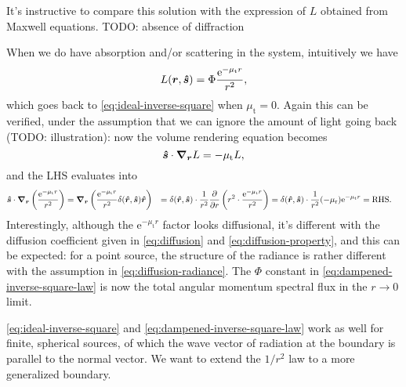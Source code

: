 \documentclass[hyperref, a4paper]{article}
\newcommand*{\ee}{\mathrm{e}}
\def\\{}%
\begin{document}
It's instructive to compare this solution with 
the expression of $L$ obtained from Maxwell equations.
TODO: absence of diffraction

When we do have absorption and/or scattering in the system, 
intuitively we have 
\begin{equation}
    L(\vb*{r}, \vu*{s}) = \Phi \frac{\ee^{- \mu_{\text{t}} r}}{r^2},
    \label{eq:dampened-inverse-square-law}
\end{equation}
which goes back to \eqref{eq:ideal-inverse-square}
when $\mu_{\text{t}} = 0$.
Again this can be verified, under the assumption that 
we can ignore the amount of light going back (TODO: illustration):
now the volume rendering equation becomes 
\begin{equation}
    \vu*{s} \cdot \grad_{\vb*{r}} L = - \mu_{\text{t}} L,
\end{equation}
and the LHS evaluates into 
\begin{equation}
    \begin{aligned}
        \vu*{s} \cdot \grad_{\vb*{r}} \left(
            \frac{\ee^{- \mu_{\text{t}} r}}{r^2}
        \right) &= 
        \grad_{\vb*{r}} \left(
            \frac{\ee^{- \mu_{\text{t}} r}}{r^2} 
            \delta(\vu*{r}, \vu*{s}) \vu*{r}
        \right)  \\
        &= \delta(\vu*{r}, \vu*{s}) \cdot \frac{1}{r^2} \pdv{r} \left(
            r^2 \cdot \frac{\ee^{- \mu_{\text{t}} r}}{r^2} 
        \right) \\
        &= \delta(\vu*{r}, \vu*{s}) \cdot \frac{1}{r^2} 
        (- \mu_{\text{r}}) \ee^{- \mu_{\text{t}} r} = \text{RHS}.
    \end{aligned}
\end{equation}
Interestingly, although the $\ee^{- \mu_{\text{t}} r}$ factor 
looks diffusional, 
it's different with the diffusion coefficient given in 
\eqref{eq:diffusion} and \eqref{eq:diffusion-property},
and this can be expected: for a point source, 
the structure of the radiance is rather different with 
the assumption in \eqref{eq:diffusion-radiance}.
The $\Phi$ constant in \eqref{eq:dampened-inverse-square-law}
is now the total angular momentum spectral flux 
in the $r \to 0$ limit.

\eqref{eq:ideal-inverse-square} and \eqref{eq:dampened-inverse-square-law}
work as well for finite, spherical sources,
of which the wave vector of radiation at the boundary 
is parallel to the normal vector.
We want to extend the $1/r^2$ law to a more generalized boundary.
\end{document}
